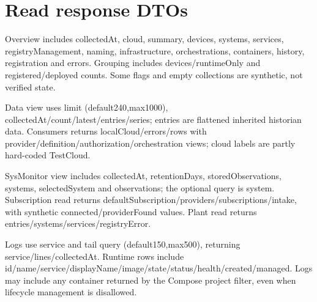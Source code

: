 \documentclass[a4paper]{arrowhead}
\begin{document}
\section{Read response DTOs}
Overview includes collectedAt, cloud, summary, devices, systems, services, registryManagement, naming, infrastructure, orchestrations, containers, history, registration and errors. Grouping includes devices/runtimeOnly and registered/deployed counts. Some flags and empty collections are synthetic, not verified state.\par
Data view uses limit (default240,max1000), collectedAt/count/latest/entries/series; entries are flattened inherited historian data. Consumers returns localCloud/errors/rows with provider/definition/authorization/orchestration views; cloud labels are partly hard-coded TestCloud.\par
SysMonitor view includes collectedAt, retentionDays, storedObservations, systems, selectedSystem and observations; the optional query is system. Subscription read returns defaultSubscription/providers/subscriptions/intake, with synthetic connected/providerFound values. Plant read returns entries/systems/services/registryError.\par
Logs use service and tail query (default150,max500), returning service/lines/collectedAt. Runtime rows include id/name/service/displayName/image/state/status/health/created/managed. Logs may include any container returned by the Compose project filter, even when lifecycle management is disallowed.\par
\end{document}
